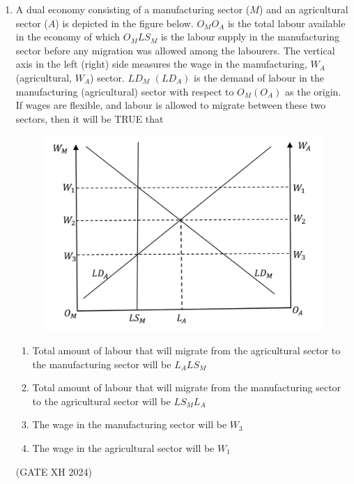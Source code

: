 \documentclass{article}
\begin{document}
\begin{enumerate}
    \begin{multicols}{2}
    \begin{enumerate}
        \item 6 apricots and 9 bananas
        \item 9 apricots and 9 bananas
        \item 4 apricots and 10 bananas
        \item 0 apricots and 12 bananas
    \end{enumerate}
    \end{multicols} \hfill (GATE XH 2024)

    \item A dual economy consisting of a manufacturing sector ($M$) and an agricultural sector ($A$) is depicted in the figure below. $O_MO_A$ is the total labour available in the economy of which $O_MLS_M$ is the labour supply in the manufacturing sector before any migration was allowed among the labourers. The vertical axis in the left (right) side measures the wage in the manufacturing, $W_A$ (agricultural, $W_A$) sector. $LD_M$ $(LD_A)$ is the demand of labour in the manufacturing (agricultural) sector with respect to $O_M(O_A)$ as the origin. If wages are flexible, and labour is allowed to migrate between these two sectors, then it will be TRUE that

    \begin{figure}[h]
        \centering
        \includegraphics[width=0.6\columnwidth]{Figures/asg1 fig3.png}
        \caption{}
        \label{Figure 3}
    \end{figure}

    \begin{enumerate}
        \item Total amount of labour that will migrate from the agricultural sector to the manufacturing sector will be $L_ALS_M$
        \item Total amount of labour that will migrate from the manufacturing sector to the agricultural sector will be $LS_ML_A$
        \item The wage in the manufacturing sector will be $W_3$
        \item The wage in the agricultural sector will be $W_1$
    \end{enumerate} \hfill (GATE XH 2024)


\end{enumerate}
\end{document}
